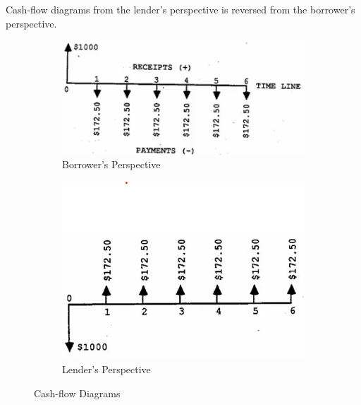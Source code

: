 \begin{remark}
    Cash-flow diagrams from the lender's perspective is reversed from the borrower's perspective.
    \begin{figure}[H]
        \centering
        \begin{subfigure}[b]{0.4\textwidth}
            \centering
            \includegraphics[width=\textwidth]{LECTURE_2/borrower_s_cash-flow.png}
            \caption{Borrower's Perspective}
            \label{fig:cash-flow_diagram_borrower}
        \end{subfigure}
        \begin{subfigure}[b]{0.4\textwidth}
            \centering
            \includegraphics[width=\textwidth]{LECTURE_2/lender_s_cash-flow.png}
            \caption{Lender's Perspective}
            \label{fig:cash-flow_diagram_lender}
        \end{subfigure}
        \caption{Cash-flow Diagrams}
        \label{fig:cash-flow_diagrams}
    \end{figure}
\end{remark}

